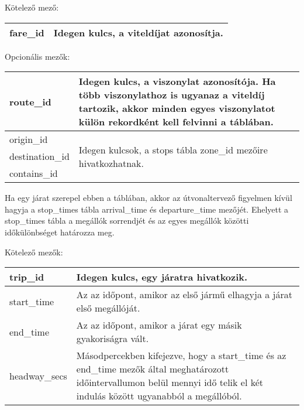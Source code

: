 \medskip

\noindent Kötelező mező:

\bigskip

\begin{tabular}{|p{3cm}|p{10cm}|}
\hline
fare\_id & Idegen kulcs, a viteldíjat azonosítja. \\
\hline
\end{tabular}

\bigskip

\noindent Opcionális mezők:

\bigskip



\begin{tabular}{|p{3cm}|p{10cm}|}
\hline
route\_id & Idegen kulcs, a viszonylat azonosítója. Ha több viszonylathoz is ugyanaz a viteldíj tartozik, akkor minden egyes viszonylatot külön rekordként kell felvinni a táblában. \\
\hline
origin\_id & \multirow{3}{10cm}{Idegen kulcsok, a stops tábla zone\_id mezőire hivatkozhatnak.} \\
\cline{1-1}
destination\_id & \\
\cline{1-1}
contains\_id & \\
\hline
\end{tabular}


Ha egy járat szerepel ebben a táblában, akkor az útvonaltervező figyelmen kívül hagyja a stop\_times tábla arrival\_time és departure\_time mezőjét. Ehelyett a stop\_times tábla a megállók sorrendjét és az egyes megállók közötti időkülönbséget határozza meg.

\medskip

\noindent Kötelező mezők:

\bigskip

\begin{tabular}{|p{3cm}|p{10cm}|}
\hline
trip\_id & Idegen kulcs, egy járatra hivatkozik. \\
\hline
start\_time & Az az időpont, amikor az első jármű elhagyja a járat első megállóját. \\
\hline
end\_time & Az az időpont, amikor a járat egy másik gyakoriságra vált. \\
\hline
headway\_secs & Másodpercekben kifejezve, hogy a start\_time és az end\_time mezők által meghatározott időintervallumon belül mennyi idő telik el két indulás között ugyanabból a megállóból. \\
\hline
\end{tabular}


